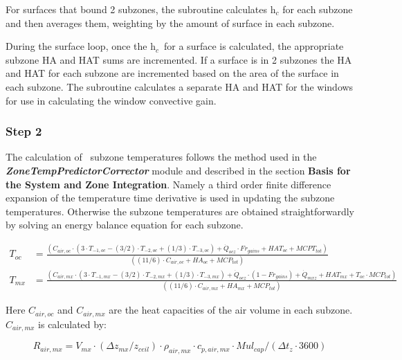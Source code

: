 For surfaces that bound 2 subzones, the subroutine calculates h\(_{c}\) for each subzone and then averages them, weighting by the amount of surface in each subzone.

During the surface loop, once the h\(_{c}\)~for a surface is calculated, the appropriate subzone HA and HAT sums are incremented. If a surface is in 2 subzones the HA and HAT for each subzone are incremented based on the area of the surface in each subzone. The subroutine calculates a separate HA and HAT for the windows for use in calculating the window convective gain.

\subsubsection{Step 2}\label{step-2-1}

The calculation of~ subzone temperatures follows the method used in the \textbf{\emph{ZoneTempPredictorCorrector}} module and described in the section \textbf{Basis for the System and Zone Integration}. Namely a third order finite difference expansion of the temperature time derivative is used in updating the subzone temperatures. Otherwise the subzone temperatures are obtained straightforwardly by solving an energy balance equation for each subzone.

\begin{equation}
  \begin{array}{cl}
    T_{oc} & = \frac{(C_{air,oc} \cdot (3 \cdot T_{ - 1,oc} - (3/2) \cdot T_{ - 2,oc} + (1/3) \cdot T_{ - 3,oc}) + \dot Q_{ocz} \cdot Fr_{gains} + HAT_{oc} + MCPT_{tot})} {((11/6) \cdot C_{air,oc} + HA_{oc} + MCP_{tot})} \\
    T_{mx} & = \frac{(C_{air,mx} \cdot (3 \cdot T_{ - 1,mx} - (3/2) \cdot T_{ - 2,mx} + (1/3) \cdot T_{ - 3,mx}) + \dot Q_{ocz} \cdot (1 - Fr_{gains}) + \dot Q_{mxz} + HAT_{mx} + T_{oc} \cdot MCP_{tot})} {((11/6) \cdot C_{air,mx} + HA_{mx} + MCP_{tot})}
  \end{array}
\end{equation}

Here \({C_{air,oc}}\) and \({C_{air,mx}}\) are the heat capacities of the air volume in each subzone. \({C_{air,mx}}\) is calculated by:

\begin{equation}
{R_{air,mx}} = {V_{mx}} \cdot \left( {\Delta {z_{mx}}/{z_{ceil}}} \right) \cdot {\rho_{air,mx}} \cdot {c_{p,air,mx}} \cdot Mu{l_{cap}}/\left( {\Delta {t_z} \cdot 3600} \right)
\end{equation}

